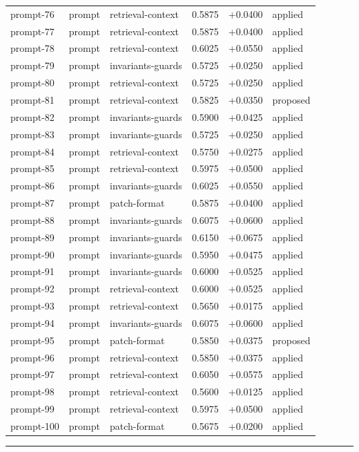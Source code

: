 \begin{center}
\begin{longtable}{llp{5.2cm}rrl}
prompt-76 & prompt & retrieval-context & 0.5875 & +0.0400 & applied \\
prompt-77 & prompt & retrieval-context & 0.5875 & +0.0400 & applied \\
prompt-78 & prompt & retrieval-context & 0.6025 & +0.0550 & applied \\
prompt-79 & prompt & invariants-guards & 0.5725 & +0.0250 & applied \\
prompt-80 & prompt & retrieval-context & 0.5725 & +0.0250 & applied \\
prompt-81 & prompt & retrieval-context & 0.5825 & +0.0350 & proposed \\
prompt-82 & prompt & invariants-guards & 0.5900 & +0.0425 & applied \\
prompt-83 & prompt & invariants-guards & 0.5725 & +0.0250 & applied \\
prompt-84 & prompt & retrieval-context & 0.5750 & +0.0275 & applied \\
prompt-85 & prompt & retrieval-context & 0.5975 & +0.0500 & applied \\
prompt-86 & prompt & invariants-guards & 0.6025 & +0.0550 & applied \\
prompt-87 & prompt & patch-format & 0.5875 & +0.0400 & applied \\
prompt-88 & prompt & invariants-guards & 0.6075 & +0.0600 & applied \\
prompt-89 & prompt & invariants-guards & 0.6150 & +0.0675 & applied \\
prompt-90 & prompt & invariants-guards & 0.5950 & +0.0475 & applied \\
prompt-91 & prompt & invariants-guards & 0.6000 & +0.0525 & applied \\
prompt-92 & prompt & retrieval-context & 0.6000 & +0.0525 & applied \\
prompt-93 & prompt & retrieval-context & 0.5650 & +0.0175 & applied \\
prompt-94 & prompt & invariants-guards & 0.6075 & +0.0600 & applied \\
prompt-95 & prompt & patch-format & 0.5850 & +0.0375 & proposed \\
prompt-96 & prompt & retrieval-context & 0.5850 & +0.0375 & applied \\
prompt-97 & prompt & retrieval-context & 0.6050 & +0.0575 & applied \\
prompt-98 & prompt & retrieval-context & 0.5600 & +0.0125 & applied \\
prompt-99 & prompt & retrieval-context & 0.5975 & +0.0500 & applied \\
prompt-100 & prompt & patch-format & 0.5675 & +0.0200 & applied \\
\bottomrule\end{longtable}\end{center}
\par\bigskip\hrule\bigskip
